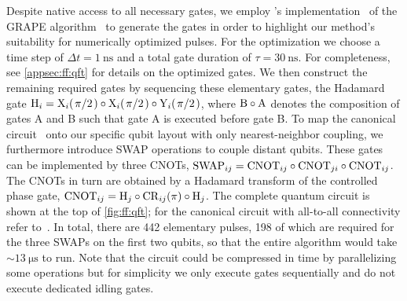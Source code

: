 Despite native access to all necessary gates, we employ \qutip's implementation~\cite{Johansson2013} of the GRAPE algorithm~\cite{Khaneja2005,Schulte-Herbruggen2005} to generate the gates in order to highlight our method's suitability for numerically optimized pulses.
For the optimization we choose a time step of $\Delta t = \qty{1}{\nano\second}$ and a total gate duration of $\tau = \qty{30}{\nano\second}$.
For completeness, see \cref{appsec:ff:qft} for details on the optimized gates.
We then construct the remaining required gates by sequencing these elementary gates, \ie the Hadamard gate $\mr{H}_i = \mr{X}_{i}(\flatfrac{\pi}{2})\circ\mr{X}_{i}(\flatfrac{\pi}{2})\circ\mr{Y}_{i}(\flatfrac{\pi}{2})$, where $\mathrm{B}\circ\mathrm{A}$ denotes the composition of gates A and B such that gate A is executed before gate B.
To map the canonical circuit~\cite{Nielsen2011} onto our specific qubit layout with only nearest-neighbor coupling, we furthermore introduce SWAP operations to couple distant qubits.
These gates can be implemented by three CNOTs, $\mathrm{SWAP}_{ij} = \mathrm{CNOT}_{ij}\circ\mathrm{CNOT}_{ji}\circ\mathrm{CNOT}_{ij}$.
The CNOTs in turn are obtained by a Hadamard transform of the controlled phase gate, $\mathrm{CNOT}_{ij} = \mathrm{H}_j\circ\mathrm{CR}_{ij}(\pi)\circ\mathrm{H}_j$.
The complete quantum circuit is shown at the top of \cref{fig:ff:qft}; for the canonical circuit with all-to-all connectivity refer to~.
In total, there are \num{442} elementary pulses, \num{198} of which are required for the three SWAPs on the first two qubits, so that the entire algorithm would take $\sim\qty{13}{\micro\second}$ to run.
Note that the circuit could be compressed in time by parallelizing some operations but for simplicity we only execute gates sequentially and do not execute dedicated idling gates.

